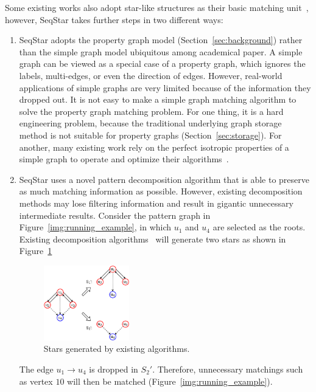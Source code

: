 Some existing works also adopt star-like structures as their basic matching unit~\cite{DBLP:journals/pvldb/SunWWSL12,DBLP:journals/pvldb/LaiQLC15},
however, SeqStar takes further steps in two different ways:
\begin{enumerate}[noitemsep,leftmargin=0pt,align=left,labelwidth=\parindent]
\item SeqStar adopts the property graph model (Section~\ref{sec:background}) rather than the simple graph model ubiquitous among academical paper.
  A simple graph can be viewed as a special case of a property graph,
  which ignores the labels, multi-edges, or even the direction of edges.
  However, real-world applications of simple graphs are very limited because of the information they dropped out.
  It is not easy to make a simple graph matching algorithm to solve the property graph matching problem.
  For one thing, it is a hard engineering problem, because the traditional underlying graph storage method is not suitable for property graphs (Section~\ref{sec:storage}).
  For another, many existing work rely on the perfect isotropic properties of a simple graph to operate and optimize their algorithms~\cite{DBLP:journals/pvldb/SunWWSL12,DBLP:conf/sigmod/HanLL13,DBLP:journals/pvldb/QiaoZC17}.
\item SeqStar uses a novel pattern decomposition algorithm that is able to preserve as much matching information as possible.
  However, existing decomposition methods may lose filtering information and result in gigantic unnecessary intermediate results.
  Consider the pattern graph in Figure~\ref{img:running_example}, in which $u_1$ and $u_4$ are selected as the roots.
  Existing decomposition algorithms~\cite{DBLP:journals/pvldb/SunWWSL12,DBLP:journals/pvldb/LaiQLC15} will generate two stars as shown in Figure~\ref{img:stwig}
  \begin{figure}[ht]
    \centering
    \includegraphics[width=0.35\textwidth]{img/stwig.pdf}
    \caption{Stars generated by existing algorithms.}\label{img:stwig}
  \end{figure}
  The edge $u_1 \rightarrow u_4$ is dropped in $S_2'$.
  Therefore, unnecessary matchings such as vertex $10$ will then be matched (Figure~\ref{img:running_example}).

\end{enumerate}
